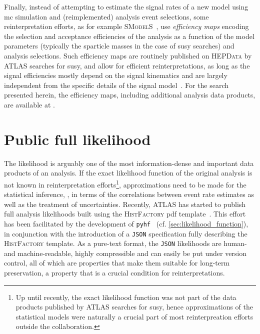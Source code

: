 Finally, instead of attempting to estimate the signal rates of a new model using \gls{mc} simulation and (reimplemented) analysis event selections, some reinterpretation efforts, as for example \textsc{SModelS}~\cite{SModelS1:2013mwa,SModelS2:2017neo}, use \textit{efficiency maps} encoding the selection and acceptance efficiencies of the analysis as a function of the model parameters (typically the sparticle masses in the case of \gls{susy} searches) and analysis selections.
Such efficiency maps are routinely published on \textsc{HEPData} by ATLAS searches for \gls{susy}, and allow for efficient reinterpretations, as long as the signal efficiencies mostly depend on the signal kinematics and are largely independent from the specific details of the signal model~\cite{SModelS1:2013mwa}. For the \onelepton search presented herein, the efficiency maps, including additional analysis data products, are available at \cite{HEPdata_1Lbb}. 

\section{Public full likelihood}\label{sec:full_likelihood}

The likelihood is arguably one of the most information-dense and important data products of an analysis.
If the exact likelihood function of the original analysis is not known in reinterpretation efforts\footnote{Up until recently, the exact likelihood function was not part of the data products published by ATLAS searches for \gls{susy}, hence approximations of the statistical models were naturally a crucial part of most reinterpreation efforts outside the collaboration.}, approximations need to be made for the statistical inference, \eg, in terms of the correlations between event rate estimates as well as the treatment of uncertainties.
Recently, ATLAS has started to publish full analysis likelihoods built using the \textsc{HistFactory} \gls{pdf} template~\cite{ATL-PHYS-PUB-2019-029}.
This effort has been facilitated by the development of \texttt{pyhf}~\cite{pyhf_joss,pyhf} (cf. \cref{sec:likelihood_function}), in conjunction with the introduction of a \texttt{JSON} specification fully describing the \textsc{HistFactory} template.
As a pure-text format, the \texttt{JSON} likelihoods are human- and machine-readable, highly compressible and can easily be put under version control, all of which are properties that make them suitable for long-term preservation, a property that is a crucial condition for reinterpretations.


